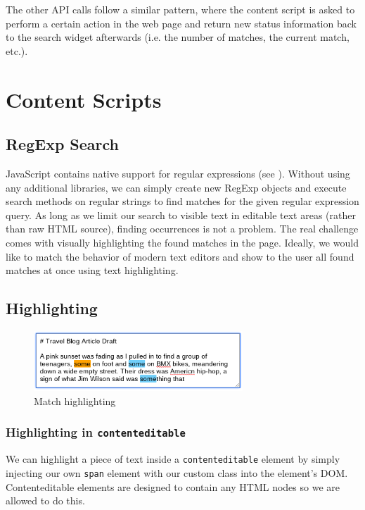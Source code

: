 \documentclass[bsc,frontabs,twoside,singlespacing,parskip,deptreport]{infthesis}
\begin{document}
The other API calls follow a similar pattern, where the content script is asked to perform a certain action in the web page and return new status information back to the search widget afterwards (i.e. the number of matches, the current match, etc.).

\section{Content Scripts}
\subsection{RegExp Search}
JavaScript contains native support for regular expressions (see \cite{M8}). Without using any additional libraries, we can simply create new RegExp objects and execute search methods on regular strings to find matches for the given regular expression query. As long as we limit our search to visible text in editable text areas (rather than raw HTML source), finding occurrences is not a problem. The real challenge comes with visually highlighting the found matches in the page. Ideally, we would like to match the behavior of modern text editors and show to the user all found matches at once using text highlighting.

\subsection{Highlighting}
\begin{figure}[h]
\centering
\includegraphics[width=0.7\textwidth]{../main/images/help/highlighting.png}
\caption{Match highlighting}
\end{figure}

\subsubsection{Highlighting in \texttt{contenteditable}}
We can highlight a piece of text inside a \texttt{contenteditable}
element by simply injecting our own \texttt{span} element with our
custom class into the element's DOM. Contenteditable elements are
designed to contain any HTML nodes so we are allowed to do this.
\end{document}
